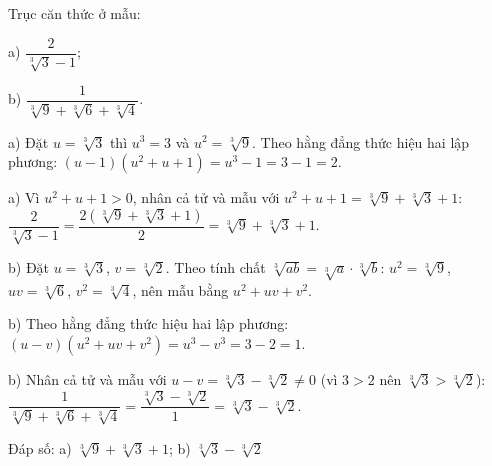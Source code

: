 \begin{problem}[9DS-CAN-029]
Trục căn thức ở mẫu:

a) $\dfrac{2}{\sqrt[3]{3} - 1}$;

b) $\dfrac{1}{\sqrt[3]{9} + \sqrt[3]{6} + \sqrt[3]{4}}$.

\begin{solution}
a) Đặt $u = \sqrt[3]{3}$ thì $u^3 = 3$ và $u^2 = \sqrt[3]{9}$. Theo hằng đẳng thức hiệu hai lập phương: $(u - 1)(u^2 + u + 1) = u^3 - 1 = 3 - 1 = 2$.

a) Vì $u^2 + u + 1 > 0$, nhân cả tử và mẫu với $u^2 + u + 1 = \sqrt[3]{9} + \sqrt[3]{3} + 1$: $\dfrac{2}{\sqrt[3]{3} - 1} = \dfrac{2(\sqrt[3]{9} + \sqrt[3]{3} + 1)}{2} = \sqrt[3]{9} + \sqrt[3]{3} + 1$.

b) Đặt $u = \sqrt[3]{3}$, $v = \sqrt[3]{2}$. Theo tính chất $\sqrt[3]{ab} = \sqrt[3]{a} \cdot \sqrt[3]{b}$: $u^2 = \sqrt[3]{9}$, $uv = \sqrt[3]{6}$, $v^2 = \sqrt[3]{4}$, nên mẫu bằng $u^2 + uv + v^2$.

b) Theo hằng đẳng thức hiệu hai lập phương: $(u - v)(u^2 + uv + v^2) = u^3 - v^3 = 3 - 2 = 1$.

b) Nhân cả tử và mẫu với $u - v = \sqrt[3]{3} - \sqrt[3]{2} \neq 0$ (vì $3 > 2$ nên $\sqrt[3]{3} > \sqrt[3]{2}$): $\dfrac{1}{\sqrt[3]{9} + \sqrt[3]{6} + \sqrt[3]{4}} = \dfrac{\sqrt[3]{3} - \sqrt[3]{2}}{1} = \sqrt[3]{3} - \sqrt[3]{2}$.

Đáp số: a) $\boxed{\sqrt[3]{9} + \sqrt[3]{3} + 1}$; b) $\boxed{\sqrt[3]{3} - \sqrt[3]{2}}$
\end{solution}
\end{problem}

